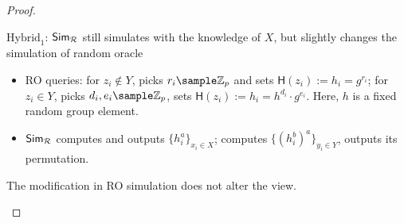 \begin{proof}
\begin{trivlist}
\item $\text{Hybrid}_1$: $\mathsf{Sim}_\mathcal{R}$ still simulates with the knowledge of $X$, 
    but slightly changes the simulation of random oracle 
\begin{itemize}
    \item RO queries: for $z_i \notin Y$, picks $r_i \sample \mathbb{Z}_p$ and sets $\mathsf{H}(z_i):= h_i = g^{r_i}$; 
        for $z_i \in Y$, 
        picks $d_i, e_i \sample \mathbb{Z}_p$, sets $\mathsf{H}(z_i):= h_i = h^{d_i} \cdot g^{e_i}$. 
        Here, $h$ is a fixed random group element.  

    \item $\mathsf{Sim}_\mathcal{R}$ computes and outputs $\{h_i^{a}\}_{x_i \in X}$; 
        computes $\{(h_i^{b})^a\}_{y_i \in Y}$, outputs its permutation.               
\end{itemize}
The modification in RO simulation does not alter the view. 

\begin{center}
\end{center}


\end{trivlist}
\end{proof}
